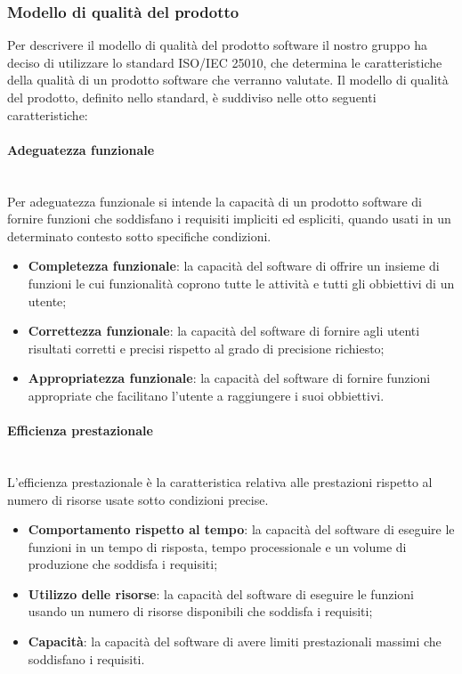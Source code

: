 \subsubsection{Modello di qualità del prodotto} 
Per descrivere il modello di qualità del prodotto software il nostro gruppo ha deciso di utilizzare lo standard ISO/IEC 25010, che determina le caratteristiche della qualità di un prodotto software che verranno valutate. Il modello di qualità del prodotto, definito nello standard, è suddiviso nelle otto seguenti caratteristiche:
	\paragraph{Adeguatezza funzionale} \mbox{}\\
	Per adeguatezza funzionale si intende la capacità di un prodotto software di fornire funzioni che soddisfano i requisiti impliciti ed espliciti, quando usati in un determinato contesto sotto specifiche condizioni.
	\begin{itemize}
		\item \textbf{Completezza funzionale}: la capacità del software di offrire un insieme di funzioni le cui funzionalità coprono tutte le attività e tutti gli obbiettivi di un utente;
		\item \textbf{Correttezza funzionale}: la capacità del software di fornire agli utenti risultati corretti e precisi rispetto al grado di precisione richiesto;
		\item \textbf{Appropriatezza funzionale}: la capacità del software di fornire funzioni appropriate che facilitano l'utente a raggiungere i suoi obbiettivi.
	\end{itemize}
	\paragraph{Efficienza prestazionale} \mbox{}\\
	L'efficienza prestazionale è la caratteristica relativa alle prestazioni rispetto al numero di risorse usate sotto condizioni precise.
	\begin{itemize}
		\item \textbf{Comportamento rispetto al tempo}: la capacità del software di eseguire le funzioni in un tempo di risposta, tempo processionale e un volume di produzione che soddisfa i requisiti;
		\item \textbf{Utilizzo delle risorse}: la capacità del software di eseguire le funzioni usando un numero di risorse disponibili che soddisfa i requisiti;
		\item \textbf{Capacità}: la capacità del software di avere limiti prestazionali massimi che soddisfano i requisiti.
	\end{itemize}
